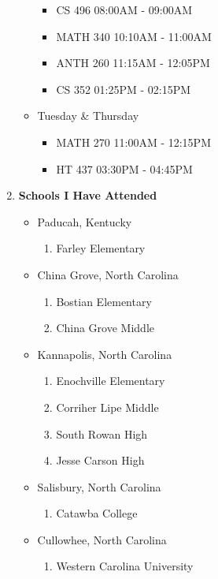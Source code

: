 \documentclass{article}
\begin{document}
\begin{enumerate}
\begin{itemize}
        \begin{itemize}
        \item CS   496 08:00AM - 09:00AM
        \item MATH 340 10:10AM - 11:00AM
        \item ANTH 260 11:15AM - 12:05PM
        \item CS   352 01:25PM - 02:15PM
        \end{itemize}
    \item Tuesday \& Thursday
        \begin{itemize}
        \item MATH 270 11:00AM - 12:15PM
        \item HT   437 03:30PM - 04:45PM
        \end{itemize}
    \end{itemize}
\item \textbf{Schools I Have Attended}
    \begin{itemize}
    \item Paducah, Kentucky
        \begin{enumerate}
        \item Farley Elementary
        \end{enumerate}
    \item China Grove, North Carolina
        \begin{enumerate}
        \item Bostian Elementary
        \item China Grove Middle
        \end{enumerate}
    \item Kannapolis, North Carolina
        \begin{enumerate}
        \item Enochville Elementary
        \item Corriher Lipe Middle
        \item South Rowan High
        \item Jesse Carson High
        \end{enumerate}
    \item Salisbury, North Carolina
        \begin{enumerate}
        \item Catawba College
        \end{enumerate}
    \item Cullowhee, North Carolina
        \begin{enumerate}
        \item Western Carolina University
        \end{enumerate}
    \end{itemize}
\end{enumerate}
\end{document}
